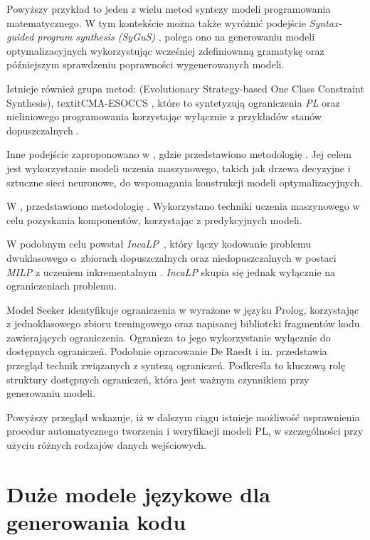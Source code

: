 Powyższy przykład to jeden z wielu metod syntezy modeli programowania matematycznego. W tym kontekście można także wyróżnić podejście \textit{Syntax-guided program synthesis (SyGuS)} \cite{6679385}, polega ono na generowaniu modeli optymalizacyjnych wykorzystując wcześniej zdefiniowaną gramatykę oraz późniejszym sprawdzeniu poprawności wygenerowanych modeli.

Istnieje również grupa metod:  (Evolutionary Strategy-based One Class Constraint Synthesis)\cite{PAWLAK2019335}, textit{CMA-ESOCCS} \cite{10.1145/3377930.3389807}, które to syntetyzują ograniczenia \textit{PL} oraz nieliniowego programowania  korzystając wyłącznie z przykładów stanów dopuszczalnych .

Inne podejście zaproponowano w \cite{LOMBARDI2017343}, gdzie przedstawiono metodologię . Jej celem jest wykorzystanie modeli uczenia maszynowego, takich jak drzewa decyzyjne i sztuczne sieci neuronowe, do wspomagania konstrukcji modeli optymalizacyjnych.

W \cite{LOMBARDI2017343}, przedstawiono metodologię . Wykorzystano techniki uczenia maszynowego  w celu pozyskania komponentów, korzystając z predykcyjnych modeli.

W podobnym celu powstał \textit{IncaLP}~\cite{8995380}, który łączy kodowanie problemu dwuklasowego o~zbiorach dopuszczalnych oraz niedopuszczalnych w postaci \textit{MILP} z uczeniem inkrementalnym . \textit{IncaLP} skupia się jednak wyłącznie na ograniczeniach problemu.

Model Seeker \cite{10.1007/978-3-642-33558-7_13} identyfikuje ograniczenia w  wyrażone w języku Prolog, korzystając z jednoklasowego zbioru treningowego oraz napisanej biblioteki fragmentów kodu zawierających ograniczenia. Ogranicza to jego wykorzystanie wyłącznie do dostępnych ograniczeń. Podobnie opracowanie De Raedt i in. \cite{de2018learning} przedstawia przegląd technik związanych z syntezą ograniczeń. Podkreśla to kluczową rolę struktury dostępnych ograniczeń, która jest ważnym czynnikiem przy generowaniu modeli.

Powyższy przegląd wskazuje, iż w dalszym ciągu istnieje możliwość usprawnienia procedur automatycznego tworzenia i weryfikacji modeli PL, w szczególności przy użyciu różnych rodzajów danych wejściowych.

\section{Duże modele językowe dla generowania kodu}

